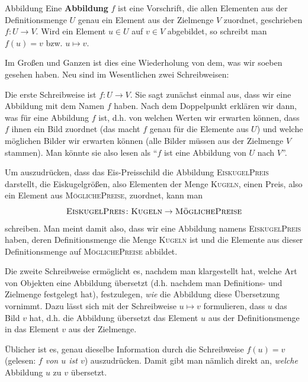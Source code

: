 \documentclass[../../main.tex]{subfiles}
\begin{document}
\begin{definition}{Abbildung}
Eine \textbf{Abbildung} $f$ ist eine Vorschrift, die allen Elementen aus der Definitionsmenge $U$ genau ein Element aus der Zielmenge $V$ zuordnet, geschrieben $f\colon U\rightarrow V$. Wird ein Element $u\in U$ auf $v\in V$ abgebildet, so schreibt man $f(u)=v$ bzw. $u\mapsto v$.
\end{definition}

Im Großen und Ganzen ist dies eine Wiederholung von dem, was wir soeben gesehen haben. Neu sind im Wesentlichen zwei Schreibweisen: 

Die erste Schreibweise ist \mbox{$f\colon U\rightarrow V$}. Sie sagt zunächst einmal aus, dass wir eine Abbildung mit dem Namen $f$ haben. Nach dem Doppelpunkt erklären wir dann, was für eine Abbildung $f$ ist, d.h. von welchen Werten wir erwarten können, dass $f$ ihnen ein Bild zuordnet (das macht $f$ genau für die Elemente aus $U$) und welche möglichen Bilder wir erwarten können (alle Bilder müssen aus der Zielmenge $V$ stammen). Man könnte sie also lesen als \enquote{$f$ ist eine Abbildung von $U$ nach $V$}.

\begin{example}{}
    Um auszudrücken, dass das Eis-Preisschild die Abbildung \textsc{EiskugelPreis} darstellt, die Eiskugelgrößen, also Elementen der Menge \textsc{Kugeln}, einen Preis, also ein Element aus \textsc{MöglichePreise}, zuordnet, kann man \[\textsc{EiskugelPreis}\colon\textsc{Kugeln}\rightarrow\textsc{MöglichePreise}\] schreiben. Man meint damit also, dass wir eine Abbildung namens \textsc{EiskugelPreis} haben, deren Definitionsmenge die Menge \textsc{Kugeln} ist und die Elemente aus dieser Definitionsmenge auf \textsc{MöglichePreise} abbildet.
\end{example}

Die zweite Schreibweise ermöglicht es, nachdem man klargestellt hat, welche Art von Objekten eine Abbildung übersetzt (d.h. nachdem man Definitions- und Zielmenge festgelegt hat), festzulegen, \emph{wie} die Abbildung diese Übersetzung vornimmt. Dazu lässt sich mit der Schreibweise $u\mapsto v$ formulieren, dass $u$ das Bild $v$ hat, d.h. die Abbildung übersetzt das Element $u$ aus der Definitionsmenge in das Element $v$ aus der Zielmenge.

Üblicher ist es, genau dieselbe Information durch die Schreibweise $f(u)=v$ (gelesen: \emph{$f$ von $u$ ist $v$}) auszudrücken. Damit gibt man nämlich direkt an, \emph{welche} Abbildung $u$ zu $v$ übersetzt.
\end{document}
